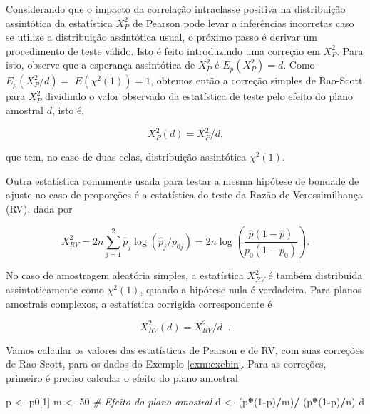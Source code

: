 \documentclass[]{book}
\newenvironment{Shaded}{\begin{snugshade}}{\end{snugshade}}
\newcommand{\DecValTok}[1]{\textcolor[rgb]{0.00,0.00,0.81}{#1}}
\newcommand{\StringTok}[1]{\textcolor[rgb]{0.31,0.60,0.02}{#1}}
\newcommand{\CommentTok}[1]{\textcolor[rgb]{0.56,0.35,0.01}{\textit{#1}}}
\newcommand{\OperatorTok}[1]{\textcolor[rgb]{0.81,0.36,0.00}{\textbf{#1}}}
\newcommand{\NormalTok}[1]{#1}
\theoremstyle{definition}
\theoremstyle{definition}
\theoremstyle{definition}
\theoremstyle{remark}
\begin{document}
Considerando que o impacto da correlação intraclasse positiva na
distribuição assintótica da estatística \(X_{P}^{2}\) de Pearson pode
levar a inferências incorretas caso se utilize a distribuição
assintótica usual, o próximo passo é derivar um procedimento de teste
válido. Isto é feito introduzindo uma correção em \(X_{P}^{2}.\) Para
isto, observe que a esperança assintótica de \(X_{P}^{2}\) é
\(E_{p}\left( X_{P}^{2}\right) =d\). Como
\(E_{p}\left( X_{P}^{2}/d\right) =\)
\(E\left( \chi ^{2}\left( 1\right) \right)=1\), obtemos então a correção
simples de Rao-Scott para \(X_{P}^{2}\) dividindo o valor observado da
estatística de teste pelo efeito do plano amostral \(d\), isto é,

\begin{equation}
X_{P}^{2}(d)=X_{P}^{2}/d\mbox{,}  
\label{eq:qual3}
\end{equation}

que tem, no caso de duas celas, distribuição assintótica
\(\chi^{2}\left( 1\right)\).

Outra estatística comumente usada para testar a mesma hipótese de
bondade de ajuste no caso de proporções é a estatística do teste da
Razão de Verossimilhança (RV), dada por

\begin{equation}
X_{RV}^{2}=2n\sum\limits_{j=1}^{2}\widehat{p}_{j}\log \left( 
\widehat{p}_{j}/p_{0j}\right) =2n\log \left( \frac{\widehat{p}\left( 1-
\widehat{p}\right) }{p_{0}\left( 1-p_{0}\right) }\right) .
\label{eq:qual4}
\end{equation}

No caso de amostragem aleatória simples, a estatística \(X_{RV}^{2}\) é
também distribuída assintoticamente como \(\chi ^{2}\left(1\right)\),
quando a hipótese nula é verdadeira. Para planos amostrais complexos, a
estatística corrigida correspondente é

\begin{equation}
X_{RV}^{2}(d)=X_{RV}^{2}/d\;\;.  
\label{eq:qual5}
\end{equation}

Vamos calcular os valores das estatísticas de Pearson e de RV, com suas
correções de Rao-Scott, para os dados do Exemplo \ref{exm:exebin}. Para
as correções, primeiro é preciso calcular o efeito do plano amostral

\begin{Shaded}
\begin{Highlighting}[]
\NormalTok{p <-}\StringTok{ }\NormalTok{p0[}\DecValTok{1}\NormalTok{]}
\NormalTok{m <-}\StringTok{ }\DecValTok{50}
\CommentTok{# Efeito do plano amostral}
\NormalTok{d <-}\StringTok{ }\NormalTok{(p}\OperatorTok{*}\NormalTok{(}\DecValTok{1}\OperatorTok{-}\NormalTok{p)}\OperatorTok{/}\NormalTok{m)}\OperatorTok{/}\StringTok{ }\NormalTok{(p}\OperatorTok{*}\NormalTok{(}\DecValTok{1}\OperatorTok{-}\NormalTok{p)}\OperatorTok{/}\NormalTok{n)}
\NormalTok{d}
\end{Highlighting}
\end{Shaded}
\end{document}
